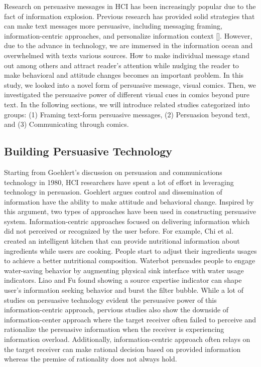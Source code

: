 
Research on persuasive messages in HCI has been increasingly popular due to the fact of information explosion. Previous research has provided solid strategies that can make text messages more persuasive, including messaging framing, information-centric approaches, and personalize information context []. However, due to the advance in technology, we are immersed in the information ocean and overwhelmed with texts various sources. How to make individual message stand out among others and attract reader's attention while nudging the reader to make behavioral and attitude changes becomes an important problem. In this study, we looked into a novel form of persuasive message, visual comics. Then, we investigated the persuasive power of different visual cues in comics beyond pure text. In the following sections, we will introduce related studies categorized into groups: (1) Framing text-form persuasive messages, (2) Persuasion beyond text, and (3) Communicating through comics.\par

\subsection{Building Persuasive Technology}
Starting from Goehlert's discussion on persuasion and communications technology in 1980, HCI researchers have spent a lot of effort in leveraging technology in persuasion. Goehlert argues control and dissemination of information have the ability to make attitude and behavioral change. Inspired by this argument, two types of approaches have been used in constructing persuasive system. Information-centric approaches focused on delivering information which did not perceived or recognized by the user before. For example, Chi et al. created an intelligent kitchen that can provide nutritional information about ingredients while users are cooking. People start to adjust their ingredients usages to achieve a better nutritional composition. Waterbot persuades people to engage water-saving behavior by augmenting physical sink interface with water usage indicators.
Liao and Fu found showing a source expertise indicator can shape user's information seeking behavior and burst the filter bubble. While a lot of studies on persuasive technology evident the persuasive power of this information-centric approach, pervious studies also show the downside of information-center approach where the target receiver often failed to perceive and rationalize the persuasive information when the receiver is experiencing information overload. Additionally, information-centric approach often relays on the target receiver can make rational decision based on provided information whereas the premise of rationality does not always hold.\par

